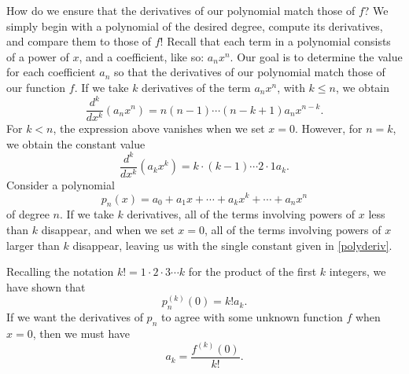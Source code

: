 
How do we ensure that the derivatives of our polynomial match those of $f$? We simply begin with a polynomial of the desired degree, compute its derivatives, and compare them to those of $f$! Recall that each term in a polynomial consists of a power of $x$, and a coefficient, like so: $a_nx^n$. Our goal is to determine the value for each coefficient $a_n$ so that the derivatives of our polynomial match those of our function $f$. If we take $k$ derivatives of the term $a_nx^n$, with $k\leq n$, we obtain
\[
\frac{d^k}{dx^k}(a_nx^n)= n(n-1)\cdots (n-k+1)a_nx^{n-k}.
\]
For $k<n$, the expression above vanishes when we set $x=0$. However, for $n=k$, we obtain the constant value
\begin{equation}\label{polyderiv}
\frac{d^k}{dx^k}(a_kx^k) = k\cdot (k-1)\cdots 2\cdot 1 a_k.
\end{equation}
Consider a polynomial
\[
p_n(x) = a_0+a_1x+\cdots +a_kx^k+\cdots +a_nx^n
\]
of degree $n$. If we take $k$ derivatives, all of the terms involving powers of $x$ less than $k$ disappear, and when we set $x=0$, all of the terms involving powers of $x$ larger than $k$ disappear, leaving us with the single constant given in \eqref{polyderiv}.

Recalling the notation $k! = 1\cdot 2\cdot 3\cdots k$ for the product of the first $k$ integers, we have shown that
\[
p_n^{(k)}(0) = k!a_k.
\]
If we want the derivatives of $p_n$ to agree with some unknown function $f$ when $x=0$, then we must have
\[
a_k = \frac{f^{(k)}(0)}{k!}.
\]





